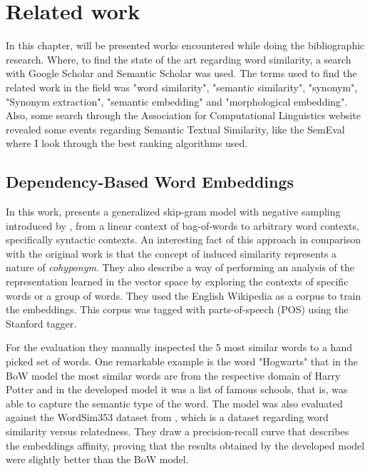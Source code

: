 \section{Related work}\label{chap:relatedwork}



In this chapter, will be presented works encountered while doing the bibliographic research. Where, to find the state of the art regarding word similarity, a search with Google Scholar and Semantic Scholar was used. The terms used to find the related work in the field was "word similarity", "semantic similarity", "synonym", "Synonym extraction", "semantic embedding" and "morphological embedding". Also, some search through the Association for Computational Linguistics website revealed some events regarding Semantic Textual Similarity, like the SemEval where I look through the best ranking algorithms used.


\subsection{Dependency-Based Word Embeddings}
In this work,  presents a generalized skip-gram model with negative sampling introduced by , from a linear context of bag-of-words to arbitrary word contexts, specifically syntactic contexts. An interesting fact of this approach in comparison with the original work is that the concept of induced similarity represents a nature of \textit{cohyponym}. They also describe a way of performing an analysis of the representation learned in the vector space by exploring the contexts of specific words or a group of words.
They used the English Wikipedia as a corpus to train the embeddings. This corpus was tagged with parts-of-speech (POS) using the Stanford tagger. 

For the evaluation they manually inspected the 5 most similar words to a hand picked set of words. One remarkable example is the word "Hogwarts" that in the BoW model the most similar words are from the respective domain of Harry Potter and in the developed model it was a list of famous schools, that is, was able to capture the semantic type of the word.
The model was also evaluated against the WordSim353 dataset from , which is a dataset regarding word similarity versus relatedness. They draw a precision-recall curve that describes the embeddings affinity, proving that the results obtained by the developed model were slightly better than the BoW model.

